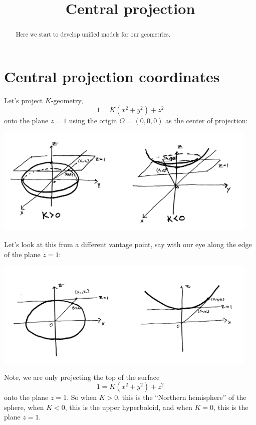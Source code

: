\documentclass{ximera}
\title{Central projection}
\begin{document}
\begin{abstract}
Here we start to develop unified models for our geometries.
\end{abstract}
\maketitle

\section{Central projection coordinates}

Let's project $K$-geometry,
\[
1=K\left(x^{2}+y^{2}\right)+z^{2} 
\]
onto the plane $z=1$ using the origin $O=(0,0,0)$ as the center of
projection:
\begin{image}
\includegraphics[width=5in]{KGeomCentralProjection.png}
\end{image}
Let's look at this from a different vantage point, say with our eye
along the edge of the plane $z=1$:
\begin{image}
\includegraphics[width=5in]{2dCentralProjection.png}
\end{image}
Note, we are only projecting the top of the surface
\[
1=K\left(x^{2}+y^{2}\right)+z^{2} 
\]
onto the plane $z=1$. So when $K>0$, this is the ``Northern hemisphere'' of
the sphere, when $K<0$, this is the upper hyperboloid, and when $K=0$,
this is the plane $z=1$.
\end{document}
